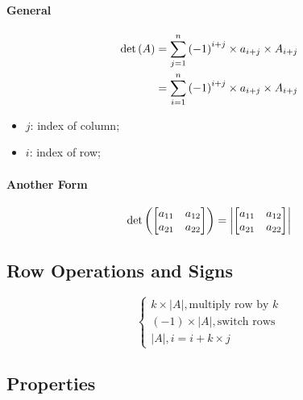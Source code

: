 \paragraph{General}

\begin{align*}
  \operatorname{det} \left( A \right)
  &= 
  \sum_{j = 1}^{n} \left( -1 \right)^{i + j} \times a_{i + j} \times A_{i + j} \\
  &=
  \sum_{i = 1}^{n} \left( -1 \right)^{i + j} \times a_{i + j} \times A_{i + j}
\end{align*}

\begin{itemize}
  \item $ j $: index of column;
  \item $ i $: index of row;
\end{itemize}

\paragraph{Another Form}

\begin{displaymath}
  \operatorname{det} 
  \left(
    \begin{bmatrix}
      a_{11} & a_{12} \\ 
      a_{21} & a_{22}
    \end{bmatrix}
  \right) 
  = 
  \left|
    \begin{bmatrix}
      a_{11} & a_{12} \\ 
      a_{21} & a_{22}
    \end{bmatrix}
  \right|
\end{displaymath}

  \subsection{Row Operations and Signs}
  
  \begin{displaymath}
    \begin{cases}
      k \times \left| A \right|, \text{multiply row by } k \\
      \left( -1 \right) \times \left| A \right|, \text{switch rows} \\ 
      \left| A \right|, i = i + k \times j
    \end{cases}
  \end{displaymath}
  
  \subsection{Properties}
  
